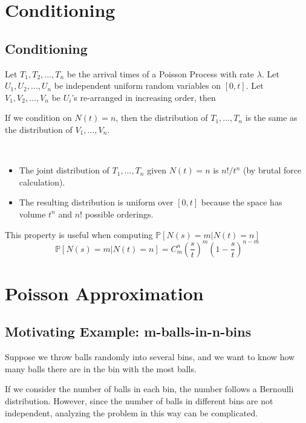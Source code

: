 \section{Conditioning}

    \subsection{Conditioning}
        Let $T_1, T_2, \dots, T_n$ be the arrival times of a Poisson Process with rate $\lambda$. Let $U_1, U_2, \dots, U_n$ be independent uniform random variables on $[0,t]$. Let $V_1, V_2, \dots, V_n$ be $U_i$'s re-arranged in increasing order, then
        \begin{theorem}[Conditioning]\label{Thm:ConditioningOfPoissonProcess}
            If we condition on $N(t)=n$, then the distribution of $T_1, \dots, T_n$ is the same as the distribution of $V_1, \dots, V_n$.
        \end{theorem}
        \begin{sketchproof}~{}
            \begin{itemize}
                \item The joint distribution of $T_1,\dots,T_n$ given $N(t)=n$ is $n!/t^n$ (by brutal force calculation).
                \item The resulting distribution is uniform over $[0,t]$ because the space has volume $t^n$ and $n!$ possible orderings.
            \end{itemize}
        \end{sketchproof}
        \begin{remark}
            This property is useful when computing $\mathbb{P}[N(s)=m|N(t)=n]$
            \[ \mathbb{P}[N(s)=m|N(t)=n] = C^n_m \left(\frac{s}{t}\right)^m\left(1-\frac{s}{t}\right)^{n-m} \]
        \end{remark}


\section{Poisson Approximation}
    \subsection{Motivating Example: m-balls-in-n-bins}\label{subsec:m-balls-in-n-bins}
        Suppose we throw balls randomly into several bins, and we want to know how many balls there are in the bin with the most balls.

        If we consider the number of balls in each bin, the number follows a Bernoulli distribution. However, since the number of balls in different bins are not independent, analyzing the problem in this way can be complicated.

